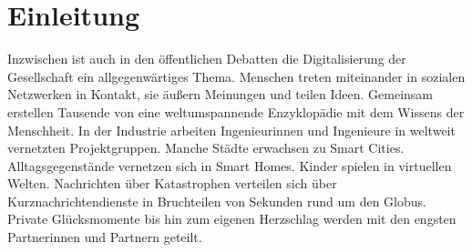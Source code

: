 \section{Einleitung}
Inzwischen ist auch in den öffentlichen Debatten die Digitalisierung der Gesellschaft ein allgegenwärtiges Thema. Menschen treten miteinander in sozialen Netzwerken in Kontakt, sie äußern Meinungen und teilen Ideen. Gemeinsam erstellen Tausende von  eine weltumspannende Enzyklopädie mit dem Wissens der Menschheit. In der Industrie arbeiten Ingenieurinnen und Ingenieure in weltweit vernetzten Projektgruppen. Manche Städte erwachsen zu Smart Cities. Alltagsgegenstände vernetzen sich in Smart Homes. Kinder spielen in virtuellen Welten. Nachrichten über Katastrophen verteilen sich über Kurznachrichtendienste in Bruchteilen von Sekunden rund um den Globus. Private Glücksmomente bis hin zum eigenen Herzschlag werden mit den engsten Partnerinnen und Partnern geteilt. 
